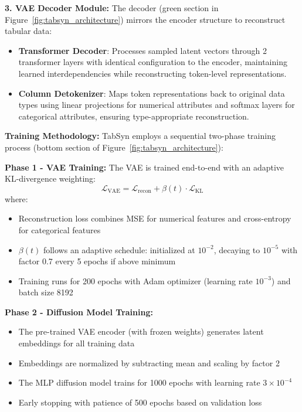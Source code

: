 \documentclass[conference]{IEEEtran}
\begin{document}
\textbf{3. VAE Decoder Module:} The decoder (green section in Figure~\ref{fig:tabsyn_architecture}) mirrors the encoder structure to reconstruct tabular data:
\begin{itemize}
    \item \textbf{Transformer Decoder}: Processes sampled latent vectors through 2 transformer layers with identical configuration to the encoder, maintaining learned interdependencies while reconstructing token-level representations.
    
    \item \textbf{Column Detokenizer}: Maps token representations back to original data types using linear projections for numerical attributes and softmax layers for categorical attributes, ensuring type-appropriate reconstruction.
\end{itemize}

\textbf{Training Methodology:} TabSyn employs a sequential two-phase training process (bottom section of Figure~\ref{fig:tabsyn_architecture}):

\textbf{Phase 1 - VAE Training:}
The VAE is trained end-to-end with an adaptive KL-divergence weighting:
\begin{equation}
\mathcal{L}_{\text{VAE}} = \mathcal{L}_{\text{recon}} + \beta(t) \cdot \mathcal{L}_{\text{KL}}
\end{equation}
where:
\begin{itemize}
    \item Reconstruction loss combines MSE for numerical features and cross-entropy for categorical features
    \item $\beta(t)$ follows an adaptive schedule: initialized at $10^{-2}$, decaying to $10^{-5}$ with factor 0.7 every 5 epochs if above minimum
    \item Training runs for 200 epochs with Adam optimizer (learning rate $10^{-3}$) and batch size 8192
\end{itemize}

\textbf{Phase 2 - Diffusion Model Training:}
\begin{itemize}
    \item The pre-trained VAE encoder (with frozen weights) generates latent embeddings for all training data
    \item Embeddings are normalized by subtracting mean and scaling by factor 2
    \item The MLP diffusion model trains for 1000 epochs with learning rate $3 \times 10^{-4}$
    \item Early stopping with patience of 500 epochs based on validation loss
\end{itemize}
\end{document}
